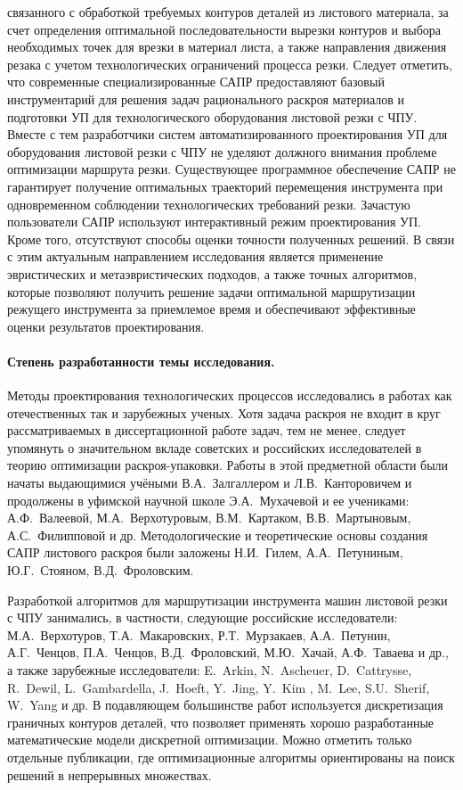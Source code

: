 связанного с обработкой требуемых контуров деталей из листового материала,
за счет определения оптимальной последовательности вырезки контуров
и выбора необходимых точек для врезки в материал листа,
а также направления движения резака
с учетом технологических ограничений процесса резки.
Следует отметить, что современные специализированные САПР предоставляют
базовый инструментарий для решения задач рационального раскроя материалов
и подготовки УП для технологического оборудования листовой резки с ЧПУ.
Вместе с тем разработчики систем автоматизированного проектирования УП
для оборудования листовой резки с ЧПУ не уделяют должного внимания
проблеме оптимизации маршрута резки.
Существующее программное обеспечение САПР не гарантирует
получение оптимальных траекторий перемещения инструмента
при одновременном соблюдении технологических требований резки.
Зачастую пользователи САПР используют интерактивный режим проектирования УП.
Кроме того, отсутствуют способы оценки точности полученных решений.
В связи с этим актуальным направлением
исследования является применение эвристических и метаэвристических подходов,
а также точных алгоритмов,
которые позволяют получить решение задачи
оптимальной маршрутизации
режущего инструмента
за приемлемое время
и обеспечивают эффективные оценки результатов проектирования.

\paragraph*{Степень разработанности темы исследования.}

Методы проектирования технологических процессов
исследовались в работах как отечественных так и зарубежных ученых.
Хотя задача раскроя не входит в круг рассматриваемых в диссертационной работе задач,
тем не менее, следует упомянуть о значительном вкладе советских и российских исследователей
в теорию оптимизации раскроя-упаковки.
Работы в этой предметной области были начаты выдающимися учёными
В.А.~Залгаллером и Л.В.~Канторовичем
и продолжены в уфимской научной школе
Э.А.~Мухачевой и ее учениками:
А.Ф.~Валеевой, М.А.~Верхотуровым, В.М.~Картаком, В.В.~Мартыновым, А.С.~Филипповой и др.
Методологические и теоретические основы создания САПР листового раскроя были заложены
Н.И.~Гилем, А.А.~Петуниным, Ю.Г.~Стояном, В.Д.~Фроловским.

Разработкой алгоритмов для маршрутизации инструмента машин листовой резки с ЧПУ занимались,
в частности, следующие российские исследователи:
М.А.~Верхотуров, Т.А.~Макаровских, Р.Т.~Мурзакаев, А.А.~Петунин, А.Г.~Ченцов,
П.А.~Ченцов, В.Д.~Фроловский, М.Ю.~Хачай,
А.Ф.~Таваева
и др.,
а также зарубежные исследователи:
E.~Arkin, N.~Ascheuer, D.~Cattrysse, R.~Dewil, L.~Gambardella, J.~Hoeft, Y.~Jing, Y.~Kim , M.~Lee, S.U.~Sherif, W.~Yang и др.
В подавляющем большинстве работ
используется дискретизация граничных контуров деталей,
что позволяет применять хорошо разработанные математические модели дискретной оптимизации.
Можно отметить только отдельные публикации,
где оптимизационные алгоритмы ориентированы на поиск решений в непрерывных множествах.

